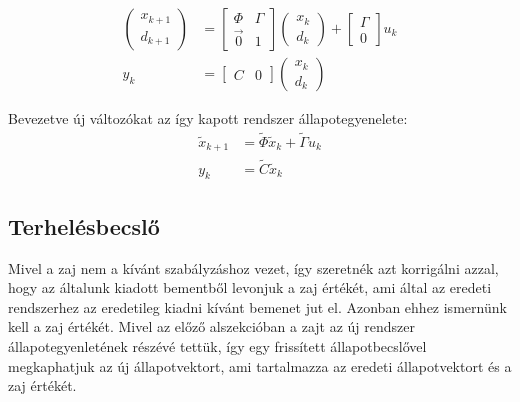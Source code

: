 \documentclass{article}
\begin{document}
        \begin{align}
            \begin{pmatrix}
                x_{k+1} \\
                d_{k+1}
            \end{pmatrix}
            & =
            \begin{bmatrix}
                \Phi & \Gamma \\
                \vec{0} & 1
            \end{bmatrix}
            \begin{pmatrix}
                x_k \\
                d_k
            \end{pmatrix}
            +
            \begin{bmatrix}
                \Gamma \\
                0
            \end{bmatrix}
            u_k \\
            y_k & =
            \begin{bmatrix}
                C & 0
            \end{bmatrix}
            \begin{pmatrix}
                x_k \\
                d_k
            \end{pmatrix}
        \end{align}
        
        Bevezetve új változókat az így kapott rendszer állapotegyenelete:
        \newcommand{\tx}{\tilde{x}}
        \newcommand{\tPhi}{\tilde{\Phi}}
        \newcommand{\tGamma}{\tilde{\Gamma}}
        \newcommand{\tC}{\tilde{C}}
        \begin{align}
            \tx_{k+1} & = \tPhi \tx_k + \tGamma u_k \\
            y_k & = \tC \tx_k
        \end{align}

    \subsection{Terhelésbecslő}
        Mivel a zaj nem a kívánt szabályzáshoz vezet, így szeretnék azt korrigálni azzal, hogy az általunk kiadott bementből levonjuk a zaj értékét, ami által az eredeti rendszerhez az eredetileg kiadni kívánt bemenet jut el. Azonban ehhez ismernünk kell a zaj értékét. Mivel az előző alszekcióban a zajt az új rendszer állapotegyenletének részévé tettük, így egy frissített állapotbecslővel megkaphatjuk az új állapotvektort, ami tartalmazza az eredeti állapotvektort és a zaj értékét.
        
\end{document}
